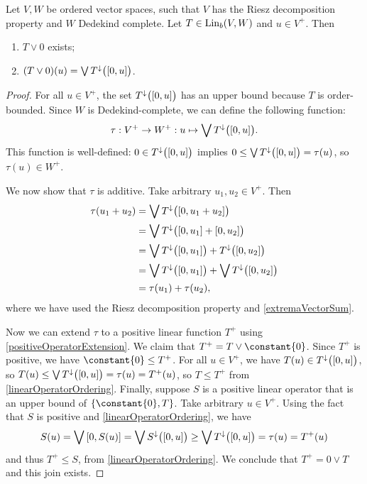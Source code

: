 \begin{proposition} \label{positivePartOrderBoundedOperator}
Let $V,W$ be ordered vector spaces, such that $V$ has the Riesz decomposition property and $W$ Dedekind complete. Let $T\in \operatorname{Lin}_b(V,W)$ and $u\in V^+$. Then
\begin{enumerate}
\item $T \vee 0$ exists;
\item $(T\vee 0)(u) = \bigvee T^\imf\big(\interval{0,u}\big)$.
\end{enumerate}
\end{proposition}
\begin{proof}
For all $u\in V^+$, the set $T^\imf\big(\interval{0,u}\big)$ has an upper bound because $T$ is order-bounded. Since $W$ is Dedekind-complete, we can define the following function:
\[ \tau: V^+ \to W^+: u \mapsto \bigvee T^\imf\big(\interval{0,u}\big). \]
This function is well-defined: $0 \in T^\imf\big(\interval{0,u}\big)$ implies $0\leq \bigvee T^\imf\big(\interval{0,u}\big) = \tau(u)$, so $\tau(u) \in W^+$.

We now show that $\tau$ is additive. Take arbitrary $u_1,u_2 \in V^+$. Then
\begin{align*}
\tau(u_1 + u_2) &= \bigvee T^\imf\big(\interval{0, u_1 + u_2}\big) \\
&= \bigvee T^\imf\big(\interval{0, u_1} + \interval{0, u_2}\big) \\
&= \bigvee T^\imf\big(\interval{0, u_1}\big) + T^\imf\big(\interval{0, u_2}\big) \\
&= \bigvee T^\imf\big(\interval{0, u_1}\big) + \bigvee T^\imf\big(\interval{0, u_2}\big) \\
&= \tau(u_1) + \tau(u_2),
\end{align*}
where we have used the Riesz decomposition property and \ref{extremaVectorSum}.

Now we can extend $\tau$ to a positive linear function $T^+$ using \ref{positiveOperatorExtension}. We claim that $T^+ = T \vee \constant{0}$. Since $T^+$ is positive, we have $\constant{0} \leq T^+$. For all $u\in V^+$, we have $T(u) \in T^\imf\big(\interval{0,u}\big)$, so $T(u) \leq \bigvee T^\imf\big(\interval{0,u}\big) = \tau(u) = T^+(u)$, so $T\leq T^+$ from \ref{linearOperatorOrdering}. Finally, suppose $S$ is a positive linear operator that is an upper bound of $\{\constant{0}, T\}$. Take arbitrary $u\in V^+$. Using the fact that $S$ is positive and \ref{linearOperatorOrdering}, we have
\[ S(u) = \bigvee \interval{0,S(u)} = \bigvee S^{\imf}\big(\interval{0,u}\big) \geq \bigvee T^{\imf}\big(\interval{0,u}\big) = \tau(u) = T^+(u) \]
and thus $T^+ \leq S$, from \ref{linearOperatorOrdering}. We conclude that $T^+ = 0\vee T$ and this join exists.
\end{proof}

